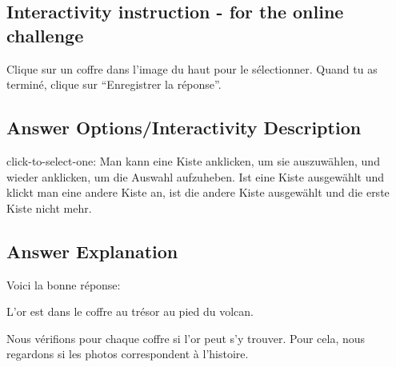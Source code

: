 \documentclass[a4paper,11pt]{report}
\newcommand{\taskGraphicsFolder}{..}
\begin{document}
\subsection*{Interactivity instruction - for the online challenge}

Clique sur un coffre dans l’image du haut pour le sélectionner. Quand tu as terminé, clique sur “Enregistrer la réponse”.

\begingroup
\renewcommand{\arraystretch}{1.5}
\subsection*{Answer Options/Interactivity Description}

click-to-select-one:  Man kann eine Kiste anklicken, um sie auszuwählen, und wieder anklicken, um die Auswahl aufzuheben.  Ist eine Kiste ausgewählt und klickt man eine andere Kiste an, ist die andere Kiste ausgewählt und die erste Kiste nicht mehr.

\endgroup

\subsection*{Answer Explanation}

Voici la bonne réponse:

{\centering%
\par}

L’or est dans le coffre au trésor au pied du volcan.

Nous vérifions pour chaque coffre si l’or peut s’y trouver. Pour cela, nous regardons si les photos correspondent à l’histoire.
\end{document}

